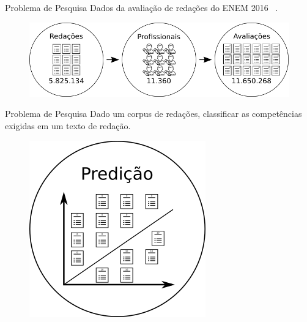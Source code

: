 \documentclass[10pt]{beamer}
\begin{document}
    \begin{frame}[fragile]{Problema de Pesquisa}
    Dados da avaliação de redações do ENEM 2016 ~\cite{paq_a:2016}.
    \begin{figure}[H]
    \begin{center}
        \includegraphics[scale=0.50]{images/enem_2016.png}
    \end{center}
    \end{figure}
    \end{frame}

    \begin{frame}[fragile]{Problema de Pesquisa}
    Dado um corpus de redações, classificar as competências exigidas em um texto de redação.
    \begin{figure}[H]
    \begin{center}
        \includegraphics[scale=0.50]{images/prediction.png}
    \end{center}
    \end{figure}
    \end{frame}
\end{document}
